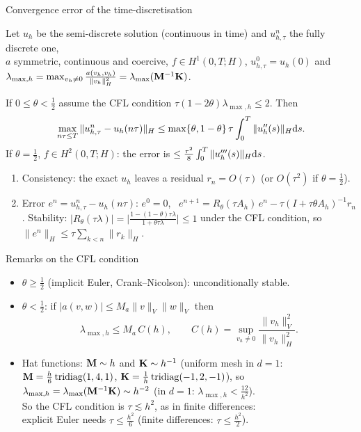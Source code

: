 \begin{frame}[squeeze]{Convergence error of the time-discretisation}
  \small
  \begin{theorem}
    Let $u_h$ be the semi-discrete solution (continuous in time) and $u_{h,\tau}^n$ the fully discrete one,\\
    $a$ symmetric, continuous and coercive, $f \in H^1(0,T;H)$, $u_{h,\tau}^0 = u_h(0)$ and
    $\lambda_{\max,h} = \max_{v_h \ne 0} \frac{a(v_h,v_h)}{\|v_h\|_H^2} = \lambda_{\max}(\mathbf{M}^{-1} \mathbf{K})$.

    If $0 \le \theta < \frac 12$ assume the \alert{CFL condition}
    $\tau (1 - 2\theta) \lambda_{\max,h} \le 2$. Then
    \[
      \max_{n\tau \le T} \|u_{h,\tau}^n - u_h(n\tau)\|_H \le \max\{\theta, 1-\theta\}\, \tau \int_0^T \|u_h''(s)\|_H {\mathrm d} s .
    \]
    If $\theta = \frac 12$, $f \in H^2(0,T;H)$: the error is $\le \frac{\tau^2}{8} \int_0^T \|u_h'''(s)\|_H {\mathrm d} s$.
  \end{theorem}
  \begin{proofsteps}
    \begin{enumerate}
      \item Consistency: the exact $u_h$ leaves a residual $r_n = O(\tau)$ (or $O(\tau^2)$ if $\theta = \frac12$).
      \item Error $e^n = u_{h,\tau}^n - u_h(n\tau)$: $e^0 = 0$, \
            $e^{n+1} = R_\theta(\tau A_h)\, e^n - \tau (I + \tau\theta A_h)^{-1} r_n$.
            Stability: $|R_\theta(\tau\lambda)| = \big|\frac{1 - (1-\theta)\tau\lambda}{1 + \theta\tau\lambda}\big| \le 1$ under the CFL condition, so $\|e^n\|_H \le \tau \sum_{k<n} \|r_k\|_H$.
    \end{enumerate}
  \end{proofsteps}
\end{frame}

\begin{frame}{Remarks on the CFL condition}
  \begin{itemize}
    \item $\theta \ge \frac12$ (implicit Euler, Crank--Nicolson): \alert{unconditionally stable}.
    \item $\theta < \frac 12$: if $|a(v,w)| \le M_a\|v\|_V\|w\|_V$ then
          \[
            \lambda_{\max,h} \le M_a\, C(h), \qquad C(h) = \sup_{v_h \ne 0} \frac{\|v_h\|_V^2}{\|v_h\|_H^2}.
          \]
    \item Hat functions: \alert{$\mathbf{M} \sim h$ and $\mathbf{K} \sim h^{-1}$} (uniform mesh in $d=1$: $\mathbf{M} = \frac h6 \operatorname{tridiag}(1,4,1)$, $\mathbf{K} = \frac1h \operatorname{tridiag}(-1,2,-1)$),
          so $\lambda_{\max,h} = \lambda_{\max}(\mathbf{M}^{-1}\mathbf{K}) \sim h^{-2}$ (in $d=1$: $\lambda_{\max,h} < \frac{12}{h^2}$).\\ So the CFL condition is $\tau \lesssim h^2$, \alert{as in finite differences}:\\ explicit Euler needs $\tau \le \frac{h^2}{6}$ (finite differences: $\tau \le \frac{h^2}{2}$).
  \end{itemize}
\end{frame}

